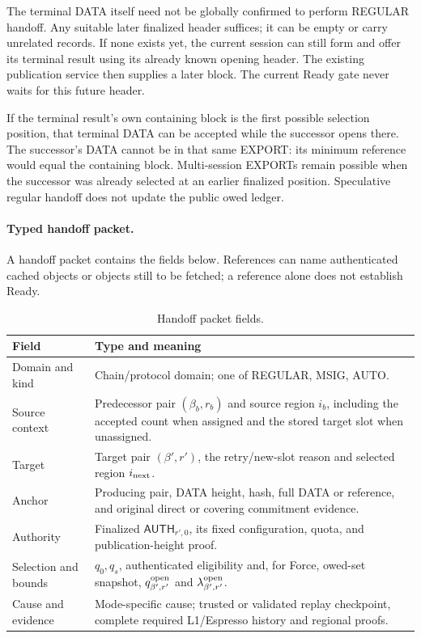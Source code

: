 \documentclass[11pt,a4paper]{article}
\newcommand{\tagg}[1]{\ensuremath{\mathsf{#1}}}
\newcounter{protocol}
\begin{document}
The terminal DATA itself need not be globally confirmed to perform
REGULAR handoff. Any suitable later finalized header suffices; it can
be empty or carry unrelated records. If none exists yet, the current
session can still form and offer its terminal result using its already
known opening header. The existing publication service then supplies
a later block. The current Ready gate never waits for this future header.

If the terminal result's own containing block is the first possible
selection position, that terminal DATA can be accepted while the
successor opens there. The successor's DATA cannot be in that same
EXPORT: its minimum reference would equal the containing block.
Multi-session EXPORTs remain possible when the successor was already
selected at an earlier finalized position. Speculative regular handoff
does not update the public owed ledger.

\paragraph{Typed handoff packet.}
A handoff packet contains the fields below. References can name
authenticated cached objects or objects still to be fetched; a reference
alone does not establish Ready.
\begin{table}[htbp]\centering\small
\caption{Handoff packet fields.}
\label{tab:handoff-packet}
\begin{tabularx}{\linewidth}{@{}>{\raggedright\arraybackslash}p{.26\linewidth}Y@{}}\toprule
Field & Type and meaning\\\midrule
Domain and kind & Chain/protocol domain; one of REGULAR, MSIG, AUTO.\\
Source context & Predecessor pair $(\beta_b,r_b)$ and source region
$i_b$, including the accepted count when assigned and the stored target
slot when unassigned.\\
Target & Target pair $(\beta',r')$, the retry/new-slot reason and selected
region $i_{\rm next}$.\\
Anchor & Producing pair, DATA height, hash, full DATA or reference,
and original direct or covering commitment evidence.\\
Authority & Finalized $\tagg{AUTH}_{r',0}$, its fixed configuration,
quota, and publication-height proof.\\
Selection and bounds & $q_0,q_s$, authenticated eligibility and,
for Force, owed-set snapshot,
$q^{\rm open}_{\beta',r'}$ and $\lambda^{\rm open}_{\beta',r'}$.\\
Cause and evidence & Mode-specific cause; trusted or validated replay
checkpoint, complete required L1/Espresso history and regional proofs.\\\bottomrule
\end{tabularx}
\end{table}
\end{document}
